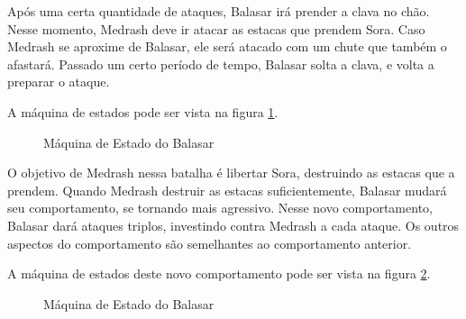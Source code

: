 Após uma certa quantidade de ataques, Balasar irá prender a clava no
chão. Nesse momento, Medrash deve ir atacar as estacas que prendem Sora.
Caso Medrash se aproxime de Balasar, ele será atacado com um chute que
também o afastará. Passado um certo período de tempo, Balasar solta a
clava, e volta a preparar o ataque.

A máquina de estados pode ser vista na figura \ref{fsm:balasar_e1}.

\begin{figure}[!ht]
 \centering
 \caption{Máquina de Estado do Balasar}
 \label{fsm:balasar_e1}
\end{figure}

O objetivo de Medrash nessa batalha é libertar Sora, destruindo as 
estacas que a prendem. Quando Medrash destruir as estacas suficientemente,
Balasar mudará seu comportamento, se tornando mais agressivo.
Nesse novo comportamento, Balasar dará ataques triplos, investindo contra
Medrash a cada ataque. Os outros aspectos do comportamento são semelhantes
ao comportamento anterior.

A máquina de estados deste novo comportamento pode ser vista na figura
 \ref{fsm:balasar_e2}.

\begin{figure}[!ht]
 \centering
 \caption{Máquina de Estado do Balasar}
 \label{fsm:balasar_e2}
\end{figure}